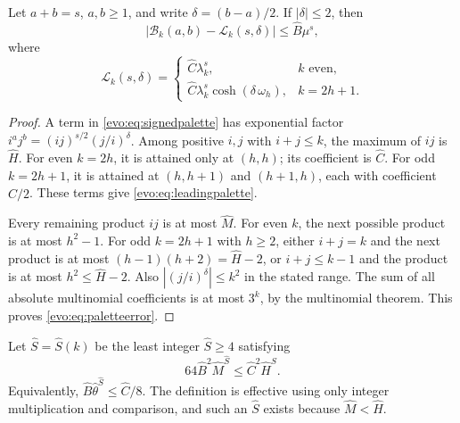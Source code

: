 \documentclass[11pt,a4paper]{article}
\numberwithin{equation}{section}
\theoremstyle{definition}
\theoremstyle{remark}
\newcommand{\Bip}{\mathcal B}
\begin{document}
\begin{lemma}\label{evo:lem:nearbalanced}
Let $a+b=s$, $a,b\ge1$, and write $\delta=(b-a)/2$. If $|\delta|\le2$, then
\begin{equation}\label{evo:eq:paletteerror}
\bigl|\Bip_k(a,b)-\mathcal L_k(s,\delta)\bigr|\le\hat B\mu^s,
\end{equation}
where
\begin{equation}\label{evo:eq:leadingpalette}
\mathcal L_k(s,\delta)=
\begin{cases}
 \hat C\lambda_k^s,&k\text{ even},\\
 \hat C\lambda_k^s\cosh(\delta\,\omega_h),&k=2h+1.
\end{cases}
\end{equation}
\end{lemma}
\begin{proof}
A term in \eqref{evo:eq:signedpalette} has exponential factor
$i^aj^b=(ij)^{s/2}(j/i)^\delta$. Among positive $i,j$ with $i+j\le k$, the
maximum of $ij$ is $\hat H$. For even $k=2h$, it is attained only at $(h,h)$;
its coefficient is $\hat C$. For odd $k=2h+1$, it is attained at $(h,h+1)$ and
$(h+1,h)$, each with coefficient $\hat C/2$. These terms give
\eqref{evo:eq:leadingpalette}.

Every remaining product $ij$ is at most $\hat M$. For even $k$, the next
possible product is at most $h^2-1$. For odd $k=2h+1$ with $h\ge2$, either
$i+j=k$ and the next product is at most $(h-1)(h+2)=\hat H-2$, or
$i+j\le k-1$ and the product is at most $h^2\le\hat H-2$. Also
$|(j/i)^\delta|\le k^2$ in the stated range. The sum of all absolute
multinomial coefficients is at most $3^k$, by the multinomial theorem. This
proves \eqref{evo:eq:paletteerror}.
\end{proof}

Let $\hat S=\hat S(k)$ be the least integer $\hat S\ge4$ satisfying
\begin{equation}\label{evo:eq:Sdefinition}
 64\hat B^2\hat M^{\hat S}\le\hat C^2\hat H^{\hat S}.
\end{equation}
Equivalently, $\hat B\hat\theta^{\hat S}\le\hat C/8$. The definition is
effective using only integer multiplication and comparison, and such an
$\hat S$ exists because $\hat M<\hat H$.
\end{document}
